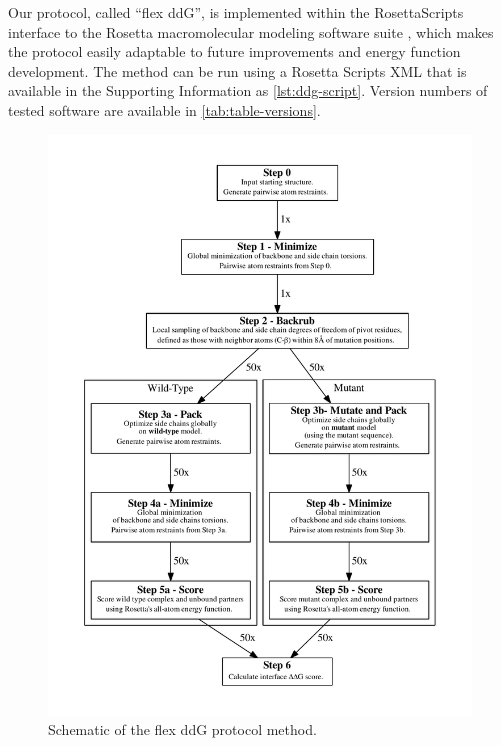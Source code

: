 Our protocol, called ``flex ddG'', is implemented within the RosettaScripts interface to the Rosetta macromolecular modeling software suite \cite{fleishman_rosettascripts:_2011}, which makes the protocol easily adaptable to future improvements and energy function development.
The method can be run using a Rosetta Scripts XML that is available in the Supporting Information as \cref{lst:ddg-script}.
Version numbers of tested software are available in \cref{tab:table-versions}.

\begin{figure}
  \centering
  \includegraphics[width=\textwidth,keepaspectratio]{figures/fig-overview.pdf}
    \caption[]{
      Schematic of the flex ddG protocol method.
  } \label{fig:figure-overview}
\end{figure}


